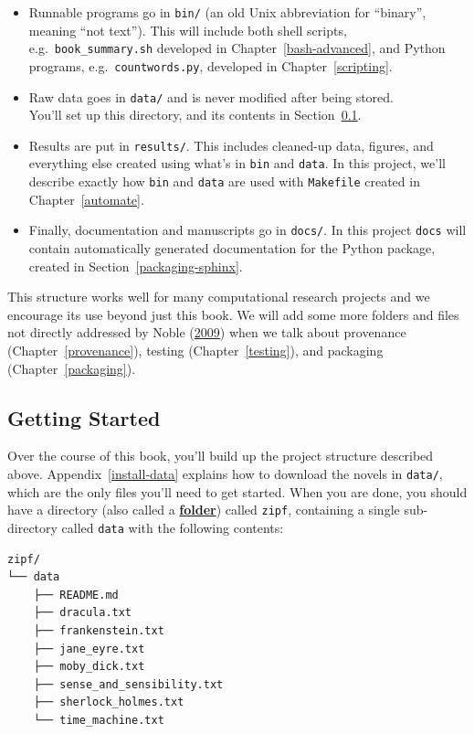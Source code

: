 \documentclass[
]{krantz}
\newcommand{\gref}[2]{\hyperlink{#2}{\textbf{#1}}}
\begin{document}
\begin{itemize}
\item
  Runnable programs go in \texttt{bin/}
  (an old Unix abbreviation for ``binary'', meaning ``not text'').
  This will include both shell scripts,
  e.g.~\texttt{book\_summary.sh} developed in Chapter~\ref{bash-advanced},
  and Python programs,
  e.g.~\texttt{countwords.py}, developed in Chapter~\ref{scripting}.
\item
  Raw data goes in \texttt{data/}
  and is never modified after being stored.\\
  You'll set up this directory,
  and its contents in Section~\ref{intro-setup}.
\item
  Results are put in \texttt{results/}.
  This includes cleaned-up data,
  figures,
  and everything else created using what's in \texttt{bin} and \texttt{data}.
  In this project,
  we'll describe exactly how \texttt{bin} and \texttt{data} are used
  with \texttt{Makefile} created in Chapter~\ref{automate}.
\item
  Finally,
  documentation and manuscripts go in \texttt{docs/}.
  In this project \texttt{docs} will contain automatically generated
  documentation for the Python package, created in
  Section~\ref{packaging-sphinx}.
\end{itemize}

This structure works well for many computational research projects and
we encourage its use beyond just this book.
We will add some more folders and files not directly addressed by Noble (\protect\hyperlink{ref-Nobl2009}{2009})
when we talk about provenance (Chapter~\ref{provenance}),
testing (Chapter~\ref{testing}),
and packaging (Chapter~\ref{packaging}).

\hypertarget{intro-setup}{%
\subsection{Getting Started}\label{intro-setup}}

Over the course of this book,
you'll build up the project structure described above.
Appendix~\ref{install-data} explains
how to download the novels in \texttt{data/},
which are the only files you'll need to get started.
When you are done,
you should have a directory (also called a \gref{folder}{folder})
called \texttt{zipf},
containing a single sub-directory called \texttt{data}
with the following contents:

\begin{verbatim}
zipf/
└── data
    ├── README.md
    ├── dracula.txt
    ├── frankenstein.txt
    ├── jane_eyre.txt
    ├── moby_dick.txt
    ├── sense_and_sensibility.txt
    ├── sherlock_holmes.txt
    └── time_machine.txt
\end{verbatim}
\end{document}
